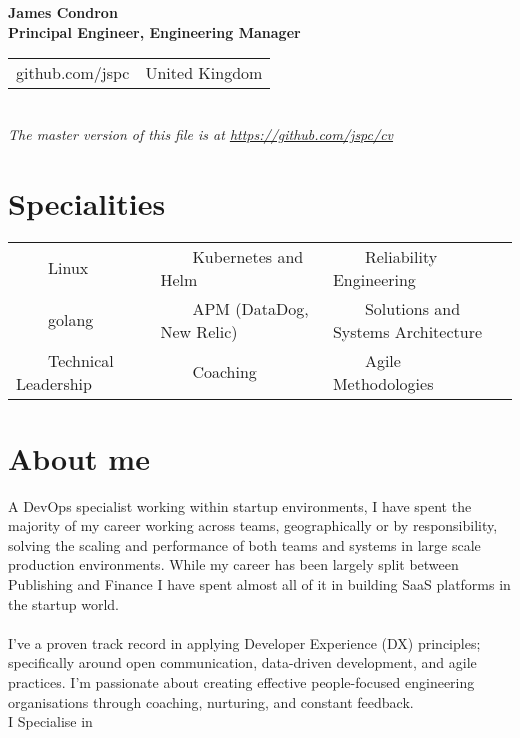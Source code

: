 \documentclass[11pt,a4paper,sans]{article}
\newcommand{\tabitem}{~~\llap{\textbullet}~~}
\begin{document}
\begin{center}
  {\huge\textbf{James Condron}}\\
  \textbf{Principal Engineer, Engineering Manager} \\

  \begin{tabular}{rl}
    github.com/jspc &  United Kingdom
  \end{tabular} \\

  {\footnotesize\textit{The master version of this file is at \url{https://github.com/jspc/cv}}}
\end{center}

\section{Specialities}
\begin{tabular}{lll}
  \tabitem Linux & \tabitem Kubernetes and Helm & \tabitem Reliability Engineering \\
  \tabitem golang & \tabitem APM (DataDog, New Relic) & \tabitem Solutions and Systems Architecture \\
  \tabitem Technical Leadership & \tabitem Coaching & \tabitem Agile Methodologies \\
\end{tabular}

\section{About me}
A DevOps specialist working within startup environments, I have spent the majority of my career working across teams, geographically or by responsibility, solving the scaling and performance of both teams and systems in large scale production environments. While my career has been largely split between Publishing and Finance I have spent almost all of it in building SaaS platforms in the startup world. \\
\\
I've a proven track record in applying Developer Experience (DX) principles; specifically around open communication, data-driven development, and agile practices. I'm passionate about creating effective people-focused engineering organisations through coaching, nurturing, and constant feedback.
\\
I Specialise in
\end{document}
